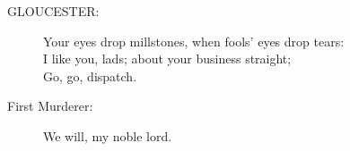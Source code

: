 \documentclass{article}
\begin{document}
\begin{description}
\item[GLOUCESTER:] 
\hspace{1pt}Your eyes drop millstones, when fools' eyes drop tears:\\
\hspace{1pt}I like you, lads; about your business straight;\\
\hspace{1pt}Go, go, dispatch.\\
\end{description}
\begin{description}
\item[First Murderer:] 
\hspace{1pt}We will, my noble lord.\\
\end{description}
\centering{\it [Exeunt]}\\
\end{document}
